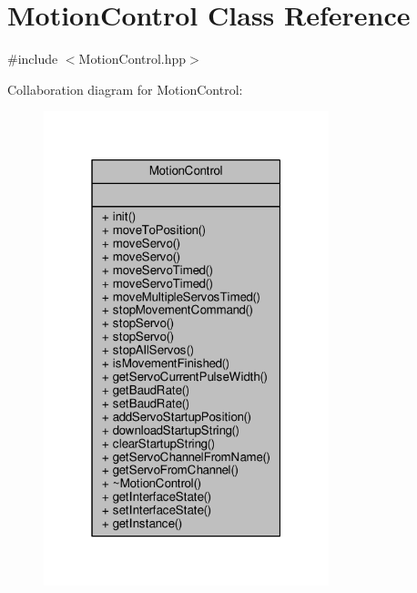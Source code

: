 \hypertarget{class_motion_control}{}\section{Motion\+Control Class Reference}
\label{class_motion_control}


{\ttfamily \#include $<$Motion\+Control.\+hpp$>$}



Collaboration diagram for Motion\+Control\+:
\nopagebreak
\begin{figure}[H]
\begin{center}
\leavevmode
\includegraphics[width=235pt]{class_motion_control__coll__graph}
\end{center}
\end{figure}
